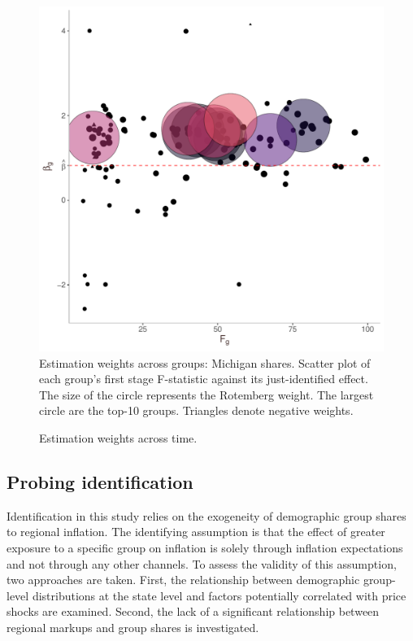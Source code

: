\documentclass[12pt]{article}
\begin{document}
\begin{figure}
\centering
\caption{Estimation weights across groups: Michigan shares. Scatter plot of each group's first stage F-statistic against its just-identified effect. The size of the circle represents the Rotemberg weight. The largest circle are the top-10 groups. Triangles denote negative weights.}\label{fig:rotweights:group}
\includegraphics[height=.85\textwidth, width = .85\textwidth]{figs/weightsout}
\end{figure}

\begin{figure}
\centering
\caption{Estimation weights across time.}\label{fig:rotweights:time}

\end{figure}



\subsection{Probing identification}

Identification in this study relies on the exogeneity of demographic group shares to regional inflation. The identifying assumption is that the effect of greater exposure to a specific group on inflation is solely through inflation expectations and not through any other channels. To assess the validity of this assumption, two approaches are taken. First, the relationship between demographic group-level distributions at the state level and factors potentially correlated with price shocks are examined. Second, the lack of a significant relationship between regional markups and group shares is investigated. 
\end{document}

